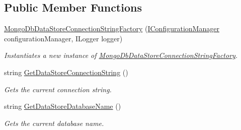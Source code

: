 \subsection*{Public Member Functions}
\begin{DoxyCompactItemize}
\item 
\hyperlink{classCqrs_1_1MongoDB_1_1Factories_1_1MongoDbDataStoreConnectionStringFactory_a9ccb753772ee1aa374ad39ba5b93700f_a9ccb753772ee1aa374ad39ba5b93700f}{Mongo\+Db\+Data\+Store\+Connection\+String\+Factory} (\hyperlink{interfaceCqrs_1_1Configuration_1_1IConfigurationManager}{I\+Configuration\+Manager} configuration\+Manager, I\+Logger logger)
\begin{DoxyCompactList}\small\item\em Instantiates a new instance of \hyperlink{classCqrs_1_1MongoDB_1_1Factories_1_1MongoDbDataStoreConnectionStringFactory}{Mongo\+Db\+Data\+Store\+Connection\+String\+Factory}. \end{DoxyCompactList}\item 
string \hyperlink{classCqrs_1_1MongoDB_1_1Factories_1_1MongoDbDataStoreConnectionStringFactory_a76986fcc9521c87bfbb6e417ef13cd53_a76986fcc9521c87bfbb6e417ef13cd53}{Get\+Data\+Store\+Connection\+String} ()
\begin{DoxyCompactList}\small\item\em Gets the current connection string. \end{DoxyCompactList}\item 
string \hyperlink{classCqrs_1_1MongoDB_1_1Factories_1_1MongoDbDataStoreConnectionStringFactory_ab8729212ac8fe8350dead56fc89a5fd2_ab8729212ac8fe8350dead56fc89a5fd2}{Get\+Data\+Store\+Database\+Name} ()
\begin{DoxyCompactList}\small\item\em Gets the current database name. \end{DoxyCompactList}\end{DoxyCompactItemize}
